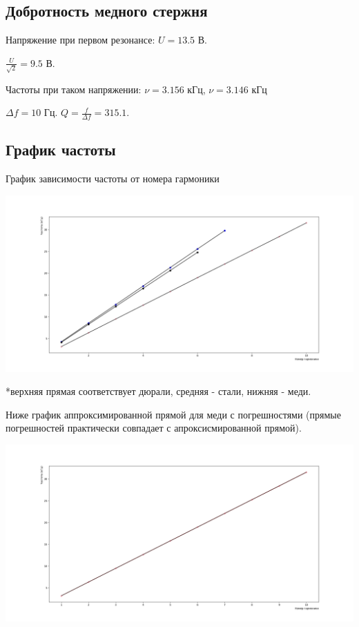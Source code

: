 \documentclass[a4paper,10pt]{article}
\begin{document}
	\subsection{Добротность медного стержня}
	Напряжение при первом резонансе: $U = 13.5$ В.
	
	$\frac{U}{\sqrt{2}} = 9.5$ В.
	
	Частоты при таком напряжении: $\nu = 3.156 \text{ кГц}$, $\nu = 3.146 \text{ кГц}$
	
	$\Delta f = 10$ Гц.
	$Q = \frac{f}{\Delta f} = 315.1.$
	\subsection{График частоты}
	График зависимости частоты от номера гармоники
	\begin{center}
		\includegraphics[width=1.2\textwidth]{Частоты гармоник.png}
		\label{Частоты гармоник}
	\end{center}
	*верхняя прямая соответствует дюрали, средняя - стали, нижняя - меди.
	
	Ниже график аппроксимированной прямой для меди с погрешностями (прямые погрешностей практически совпадает с апроксисмированной прямой).
	\begin{center}
		\includegraphics[width=1.2\textwidth]{медь апрокс.png}
		\label{медь апрокс}
	\end{center}
	
\end{document}
